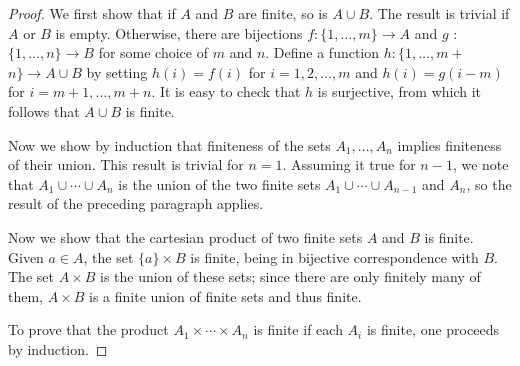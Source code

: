 \begin{proof}
 We first show that if \(A\) and \(B\) are finite, so is \(A \cup B\). The result is trivial if \(A\) or \(B\) is empty. Otherwise, there are bijections \(f : \{1,\ldots, m\} \rightarrow A\) and \(g\) : \(\{1,\ldots, n\} \rightarrow B\) for some choice of \(m\) and \(n\). Define a function \(h : \{1,\ldots, m +\) \(n\} \rightarrow A \cup B\) by setting \(h(i) = f(i)\) for \(i = 1,2,\ldots, m\) and \(h(i) = g({i - m})\) for \(i = m + 1,\ldots, m + n\). It is easy to check that \(h\) is surjective, from which it follows that \(A \cup B\) is finite.

 Now we show by induction that finiteness of the sets \(A_{1},\ldots ,A_{n}\) implies finiteness of their union. This result is trivial for \(n = 1\). Assuming it true for \(n - 1\), we note that \(A_{1} \cup \cdots \cup {A}_{n}\) is the union of the two finite sets \(A_{1} \cup \cdots \cup {A}_{n - 1}\) and \(A_{n}\), so the result of the preceding paragraph applies.

 Now we show that the cartesian product of two finite sets \(A\) and \(B\) is finite. Given \(a \in A\), the set \(\{ a\} \times B\) is finite, being in bijective correspondence with \(B\). The set \(A \times B\) is the union of these sets; since there are only finitely many of them, \(A \times B\) is a finite union of finite sets and thus finite.

 To prove that the product \(A_{1} \times \cdots \times {A}_{n}\) is finite if each \(A_{i}\) is finite, one proceeds by induction.
\end{proof}

